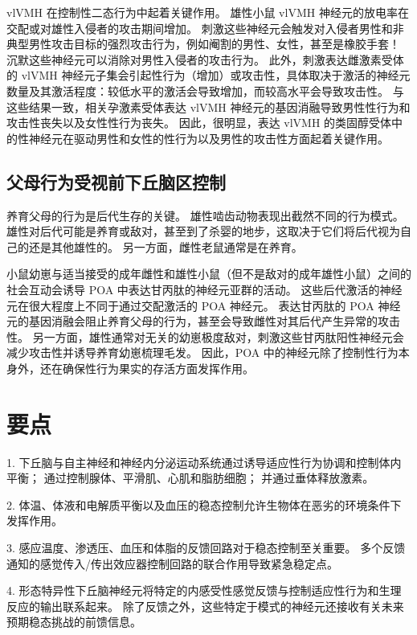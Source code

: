 vlVMH 在控制性二态行为中起着关键作用。
雄性小鼠 vlVMH 神经元的放电率在交配或对雄性入侵者的攻击期间增加。
刺激这些神经元会触发对入侵者男性和非典型男性攻击目标的强烈攻击行为，例如阉割的男性、女性，甚至是橡胶手套！
沉默这些神经元可以消除对男性入侵者的攻击行为。
此外，刺激表达雌激素受体的 vlVMH 神经元子集会引起性行为（增加）或攻击性，具体取决于激活的神经元数量及其激活程度：较低水平的激活会导致增加，而较高水平会导致攻击性。
与这些结果一致，相关孕激素受体表达 vlVMH 神经元的基因消融导致男性性行为和攻击性丧失以及女性性行为丧失。
因此，很明显，表达 vlVMH 的类固醇受体中的性神经元在驱动男性和女性的性行为以及男性的攻击性方面起着关键作用。



\subsection{父母行为受视前下丘脑区控制}

养育父母的行为是后代生存的关键。
雄性啮齿动物表现出截然不同的行为模式。
雄性对后代可能是养育或敌对，甚至到了杀婴的地步，这取决于它们将后代视为自己的还是其他雄性的。
另一方面，雌性老鼠通常是在养育。


小鼠幼崽与适当接受的成年雌性和雄性小鼠（但不是敌对的成年雄性小鼠）之间的社会互动会诱导 POA 中表达甘丙肽的神经元亚群的活动。
这些后代激活的神经元在很大程度上不同于通过交配激活的 POA 神经元。
表达甘丙肽的 POA 神经元的基因消融会阻止养育父母的行为，甚至会导致雌性对其后代产生异常的攻击性。
另一方面，雄性通常对无关的幼崽极度敌对，刺激这些甘丙肽阳性神经元会减少攻击性并诱导养育幼崽梳理毛发。
因此，POA 中的神经元除了控制性行为本身外，还在确保性行为果实的存活方面发挥作用。



\section{要点}

1. 下丘脑与自主神经和神经内分泌运动系统通过诱导适应性行为协调和控制体内平衡；
通过控制腺体、平滑肌、心肌和脂肪细胞；
并通过垂体释放激素。 


2. 体温、体液和电解质平衡以及血压的稳态控制允许生物体在恶劣的环境条件下发挥作用。


3. 感应温度、渗透压、血压和体脂的反馈回路对于稳态控制至关重要。
多个反馈通知的感觉传入/传出效应器控制回路的联合作用导致紧急稳定点。


4. 形态特异性下丘脑神经元将特定的内感受性感觉反馈与控制适应性行为和生理反应的输出联系起来。
除了反馈之外，这些特定于模式的神经元还接收有关未来预期稳态挑战的前馈信息。


